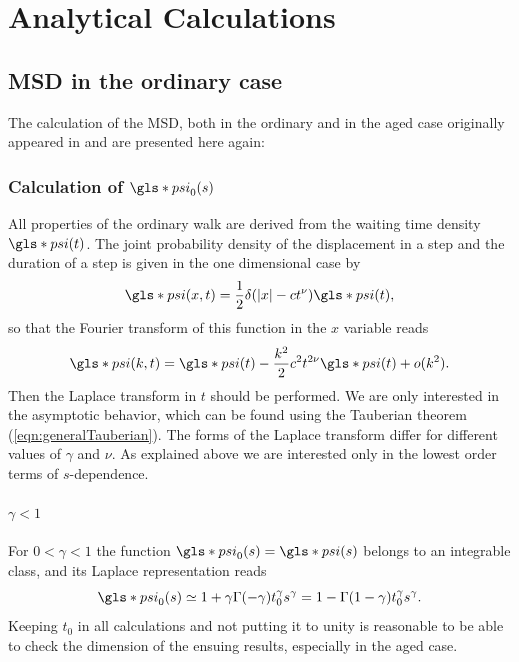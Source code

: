 \chapter{Analytical Calculations}

\section{MSD in the ordinary case}

The calculation of the MSD, both in the ordinary and in the aged case originally appeared in 
\cite{bothe} 
and are presented here again:

\subsection*{Calculation of $\gls*{psi}_0(s)$}

All properties of the ordinary walk are derived from the waiting time density $\gls*{psi}(t)$. The joint probability density of the displacement in a step and the duration of a step is given in the one dimensional case by
%
\begin{equation}
 \gls*{psi}(x,t) = \frac{1}{2} \delta(|x| - ct^\nu ) \gls*{psi}(t),
\end{equation}
%
so that the Fourier transform of this function in the $x$ variable reads
\begin{equation}
 \gls*{psi}(k,t) = \gls*{psi}(t) - \frac{k^2}{2} c^2 t^{2 \nu} \gls*{psi}(t) + o(k^2). 
\end{equation}
%
Then the Laplace transform in $t$ should be performed.  We are only interested in the asymptotic behavior, which can be found using the Tauberian theorem (\ref{eqn:generalTauberian}). The forms of the Laplace transform 
differ for different values of $\gamma$ and $\nu$. As explained above we are interested only in the lowest order terms of $s$-dependence. 

\subsubsection*{$ \gamma<1$}
For $0<\gamma <1$ the function $ \gls*{psi}_0(s) = \gls*{psi}(s)$ belongs to an integrable class, and its Laplace representation reads
\begin{equation}
 \gls*{psi}_0(s) \simeq 1 + \gamma \Gamma(-\gamma) t_0^\gamma s^\gamma 
 = 1-\Gamma(1-\gamma) t_0^\gamma s^\gamma. \label{eqn:psi0GammaSmall}
\end{equation}
Keeping $t_0$ in all calculations and not putting it to unity is reasonable to be able to check the dimension of the ensuing results, especially in the aged case. 

